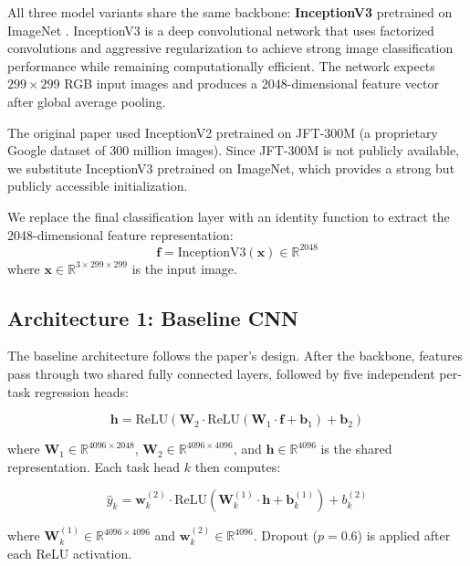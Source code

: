 \documentclass[11pt,a4paper]{article}
\begin{document}
All three model variants share the same backbone: \textbf{InceptionV3} \cite{szegedy2016} pretrained on ImageNet \cite{deng2009}. InceptionV3 is a deep convolutional network that uses factorized convolutions and aggressive regularization to achieve strong image classification performance while remaining computationally efficient. The network expects $299 \times 299$ RGB input images and produces a 2048-dimensional feature vector after global average pooling.

The original paper \cite{thames2021} used InceptionV2 pretrained on JFT-300M (a proprietary Google dataset of 300 million images). Since JFT-300M is not publicly available, we substitute InceptionV3 pretrained on ImageNet, which provides a strong but publicly accessible initialization.

We replace the final classification layer with an identity function to extract the 2048-dimensional feature representation:
\begin{equation}
  \mathbf{f} = \text{InceptionV3}(\mathbf{x}) \in \mathbb{R}^{2048}
\end{equation}
where $\mathbf{x} \in \mathbb{R}^{3 \times 299 \times 299}$ is the input image.

\subsection{Architecture 1: Baseline CNN}

The baseline architecture follows the paper's design. After the backbone, features pass through two shared fully connected layers, followed by five independent per-task regression heads:

\begin{equation}
  \mathbf{h} = \text{ReLU}(\mathbf{W}_2 \cdot \text{ReLU}(\mathbf{W}_1 \cdot \mathbf{f} + \mathbf{b}_1) + \mathbf{b}_2)
\end{equation}

where $\mathbf{W}_1 \in \mathbb{R}^{4096 \times 2048}$, $\mathbf{W}_2 \in \mathbb{R}^{4096 \times 4096}$, and $\mathbf{h} \in \mathbb{R}^{4096}$ is the shared representation. Each task head $k$ then computes:

\begin{equation}
  \hat{y}_k = \mathbf{w}_k^{(2)} \cdot \text{ReLU}(\mathbf{W}_k^{(1)} \cdot \mathbf{h} + \mathbf{b}_k^{(1)}) + b_k^{(2)}
\end{equation}

where $\mathbf{W}_k^{(1)} \in \mathbb{R}^{4096 \times 4096}$ and $\mathbf{w}_k^{(2)} \in \mathbb{R}^{4096}$. Dropout ($p = 0.6$) is applied after each ReLU activation.
\end{document}

